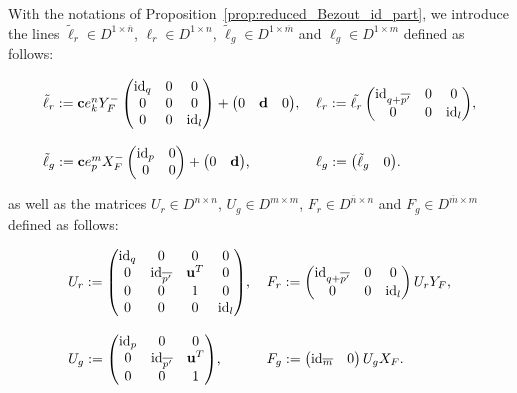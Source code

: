 \documentclass{ifacconf}
\newcommand\g[1]{\textbf{#1}}
\newcommand\id[1]{\text{id}_{#1}}
\begin{document}
With the notations of Proposition~\ref{prop:reduced_Bezout_id_part},
we introduce the lines $\tilde{\ell}_r\in D^{1\times\overline{n}}$,
$\ell_r\in D^{1\times n}$, $\tilde{\ell}_g\in D^{1\times\overline{m}}$
and $\ell_g\in D^{1\times m}$ defined as follows:
\smallskip
\begin{small}
  \[\begin{tabular}{l l}
  $\tilde{\ell}_r:=\g{c}e^n_kY_F^-\begin{pmatrix}
  \id{q} & 0 & 0\\
  0 & 0 & 0\\
  0 & 0 & \id{l}
  \end{pmatrix}+\begin{pmatrix} 0 & \g{d} & 0
  \end{pmatrix}$, &
  $\ell_r:=\tilde{\ell_r}\begin{pmatrix}
    \id{q+\overline{p'}} & 0 & 0\\
    0 & 0 & \id{l}
  \end{pmatrix}$,\\
  & \\
  $\tilde{\ell}_g:=\g{c}e^m_pX_F^-\begin{pmatrix}
  \id{p} & 0\\
  0 & 0\end{pmatrix}+\begin{pmatrix}0 & \g{d}\end{pmatrix}$, &
  $\ell_g:=\begin{pmatrix}\tilde{\ell}_g & 0\end{pmatrix}$.
  \end{tabular}\]
\end{small}
\smallskip
as well as the matrices $U_r\in D^{n\times n}$, $U_g\in D^{m\times m}$,
$F_r\in D^{\overline{n}\times n}$ and $F_g\in D^{\overline{m}\times m}$
defined as follows:
\smallskip
\begin{small}
  \[\begin{tabular}{l l}
  $U_r:=\begin{pmatrix}
  \id{q} & 0 & 0 & 0\\
  0 & \id{\overline{p'}} & \g{u}^T & 0\\
  0 & 0 & 1 & 0\\
  0 & 0 & 0 & \id{l}
  \end{pmatrix}$, &
  $F_r:=\begin{pmatrix}
  \id{q+\overline{p'}} & 0 & 0\\
  0 & 0 & \id{l}
  \end{pmatrix}U_rY_F$,\\
  & \\
  $U_g:=\begin{pmatrix}
  \id{p} & 0 & 0\\
  0 & \id{\overline{p'}} & \g{u}^T\\
  0 & 0 & 1\end{pmatrix}$,
  &
  $F_g:=\begin{pmatrix}\id{\overline{m}} & 0\end{pmatrix}U_gX_F$.
  \end{tabular}\]
\end{small}
\end{document}
